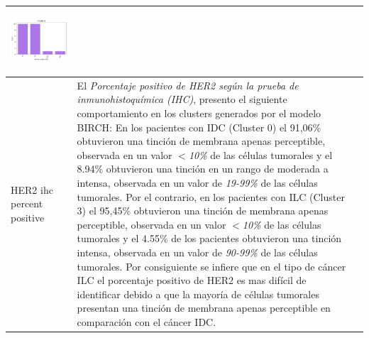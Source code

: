 \begin{table}[htb!]
\begin{threeparttable}
\begin{tabular}{p{2.5cm} p{7cm} p{6.5cm}}
			\begin{center}\includegraphics[width=1\linewidth]{NOTEBOOK/IMAGENES_BIRCH_CLUSTERING/4_Cluster_3_tumor_stage_code}\end{center}
			
			\\ \hline
			HER2 ihc percent positive
			& El \textit{Porcentaje positivo de HER2 según la prueba de inmunohistoquímica (IHC)}, presento el siguiente comportamiento en los clusters generados por el modelo BIRCH: En los pacientes con IDC (Cluster 0) el 91,06\%  obtuvieron una tinción de membrana apenas perceptible, observada en un valor $<$\textit{10\%} de las células tumorales y el 8.94\% obtuvieron una tinción en un rango de moderada a intensa, observada en un valor de \textit{19-99\%} de las células tumorales. Por el contrario, en los pacientes con ILC (Cluster 3) el 95,45\%  obtuvieron una tinción de membrana apenas perceptible, observada en un valor $<$\textit{10\%} de las células tumorales y el 4.55\% de los pacientes obtuvieron una tinción intensa, observada en un valor de \textit{90-99\%} de las células tumorales. Por consiguiente se infiere que en el tipo de cáncer ILC el porcentaje positivo de HER2 es mas difícil de identificar debido a que la mayoría de células tumorales presentan una tinción de membrana apenas perceptible en comparación con el cáncer IDC.
			

\end{tabular}
\end{threeparttable}
\end{table}
